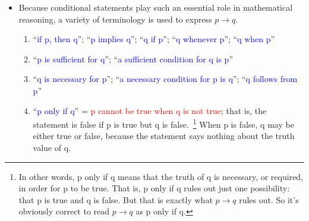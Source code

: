 \documentclass[aspectratio=169]{beamer}
\providecommand{\Blue}[1]{\textcolor{blue}{#1}}
\providecommand{\Red}[1]{\textcolor{red}{#1}}
\begin{document}
\begin{frame}[plain]{}

\begin{itemize}
   \item Because conditional statements play such an essential role in mathematical reasoning, 
     a variety of terminology is used to express $p\rightarrow q$. 
     \begin{enumerate}
      \item ``\Blue{if p, then q}''; ``\Blue{p implies q}'';
           ``\Blue{q if p}''; ``\Blue{q whenever p}''; ``\Blue{q when p}''
      \item ``\Blue{p is sufficient for q}''; ``\Blue{a sufficient condition for q is p}''
      \item ``\Blue{q is necessary for p}'';
             ``\Blue{a necessary condition for p is q}'';
         ``\Blue{q follows from p}''
      \item ``\Blue{p only if q}'' = \Red{p cannot be true when q is not true}; that is, the statement is false
          if p is true but q is false.~\footnote{In other words,
            p only if q means that the truth of q is necessary, or required, in order for p to be true.
              That is, p only if q rules out just one possibility: that p is true and q is false. 
              But that is exactly what $p\rightarrow q$ rules out.
              So it’s obviously correct to read $p\rightarrow q$ as p only if q.}
          When p is false, q may be either true or false, 
           because the statement says nothing about the truth value of q.
     \end{enumerate} 
    \end{itemize}
\end{frame}
\end{document}
